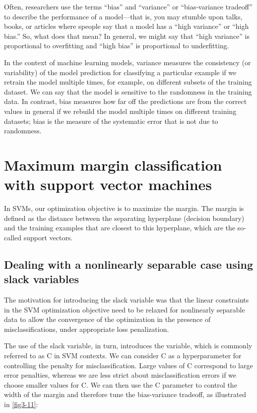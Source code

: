 \begin{tcolorbox}[title=The bias-variance tradeoff]
    Often, researchers use the terms “bias” and “variance” or “bias-variance tradeoff” to describe the performance of a model—that is, you may stumble upon talks, books, or articles where speople say that a model has a “high variance” or “high bias.” So, what does that mean? In general, we might say that “high variance” is proportional to overfitting and “high bias” is proportional to underfitting.

    In the context of machine learning models, variance measures the consistency (or variability) of the model prediction for classifying a particular example if we retrain the model multiple times, for example, on different subsets of the training dataset. We can say that the model is sensitive to the randomness in the training data. In contrast, bias measures how far off the predictions are from the correct values in general if we rebuild the model multiple times on different training datasets; bias is the measure of the systematic error that is not due to randomness.
\end{tcolorbox}
\section{Maximum margin classification with support vector machines}
In SVMs, our optimization objective is to maximize the margin. The margin is defined as the distance between the separating hyperplane (decision boundary) and the training examples that are closest to this hyperplane, which are the so-called support vectors.
\subsection{Dealing with a nonlinearly separable case using slack variables}
The motivation for introducing the slack variable was that the linear constraints in the SVM optimization objective need to be relaxed for nonlinearly separable data to allow the convergence of the optimization in the presence of misclassifications, under appropriate loss penalization.

The use of the slack variable, in turn, introduces the variable, which is commonly referred to as \textsf{C} in SVM contexts. We can consider \textsf{C} as a hyperparameter for controlling the penalty for misclassification. Large values of \textsf{C} correspond to large error penalties, whereas we are less strict about misclassification errors if we choose smaller values for \textsf{C}. We can then use the \textsf{C} parameter to control the width of the margin and therefore tune the bias-variance tradeoff, as illustrated in \autoref{fig3-11}:

